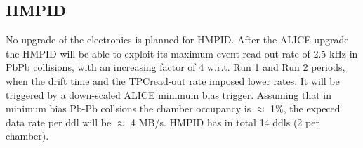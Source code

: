 \subsection{HMPID}
\label{HMPID:datarate}

No upgrade of the electronics is planned for HMPID. After the ALICE upgrade the HMPID will be able to exploit its maximum event read out rate
of 2.5 kHz in PbPb collisions, with an increasing factor of 4 w.r.t. Run 1 and Run
2 periods, when the drift time and the TPCread-out rate imposed lower rates. It will be triggered by a down-scaled ALICE minimum bias trigger.
Assuming that in minimum bias Pb-Pb collsions the chamber occupancy is $\approx$ 1\%, the expeced data rate per ddl will be $\approx$ 4 MB/s. 
HMPID has in total 14 ddls (2 per chamber). 

